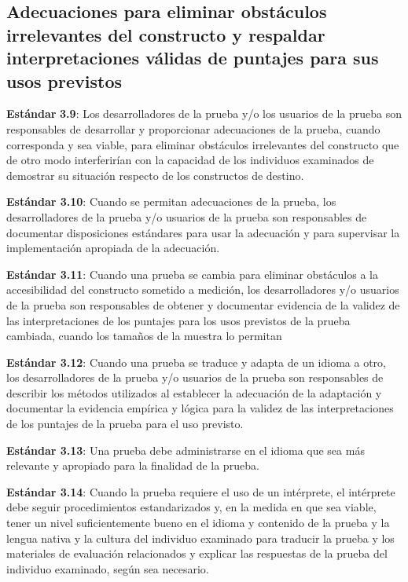 \documentclass[
  letterpaper,
  DIV=11,
  numbers=noendperiod]{scrreprt}
\begin{document}
\subsection{Adecuaciones para eliminar obstáculos irrelevantes del
constructo y respaldar interpretaciones válidas de puntajes para sus
usos
previstos}\label{adecuaciones-para-eliminar-obstuxe1culos-irrelevantes-del-constructo-y-respaldar-interpretaciones-vuxe1lidas-de-puntajes-para-sus-usos-previstos}

\textbf{Estándar} \textbf{3.9}: Los desarrolladores de la prueba y/o los
usuarios de la prueba son responsables de desarrollar y proporcionar
adecuaciones de la prueba, cuando corresponda y sea viable, para
eliminar obstáculos irrelevantes del constructo que de otro modo
interferirían con la capacidad de los individuos examinados de demostrar
su situación respecto de los constructos de destino.

\textbf{Estándar 3.10}: Cuando se permitan adecuaciones de la prueba,
los desarrolladores de la prueba y/o usuarios de la prueba son
responsables de documentar disposiciones estándares para usar la
adecuación y para supervisar la implementación apropiada de la
adecuación.

\textbf{Estándar 3.11}: Cuando una prueba se cambia para eliminar
obstáculos a la accesibilidad del constructo sometido a medición, los
desarrolladores y/o usuarios de la prueba son responsables de obtener y
documentar evidencia de la validez de las interpretaciones de los
puntajes para los usos previstos de la prueba cambiada, cuando los
tamaños de la muestra lo permitan

\textbf{Estándar 3.12}: Cuando una prueba se traduce y adapta de un
idioma a otro, los desarrolladores de la prueba y/o usuarios de la
prueba son responsables de describir los métodos utilizados al
establecer la adecuación de la adaptación y documentar la evidencia
empírica y lógica para la validez de las interpretaciones de los
puntajes de la prueba para el uso previsto.

\textbf{Estándar 3.13}: Una prueba debe administrarse en el idioma que
sea más relevante y apropiado para la finalidad de la prueba.

\textbf{Estándar 3.14}: Cuando la prueba requiere el uso de un
intérprete, el intérprete debe seguir procedimientos estandarizados y,
en la medida en que sea viable, tener un nivel suficientemente bueno en
el idioma y contenido de la prueba y la lengua nativa y la cultura del
individuo examinado para traducir la prueba y los materiales de
evaluación relacionados y explicar las respuestas de la prueba del
individuo examinado, según sea necesario.
\end{document}
